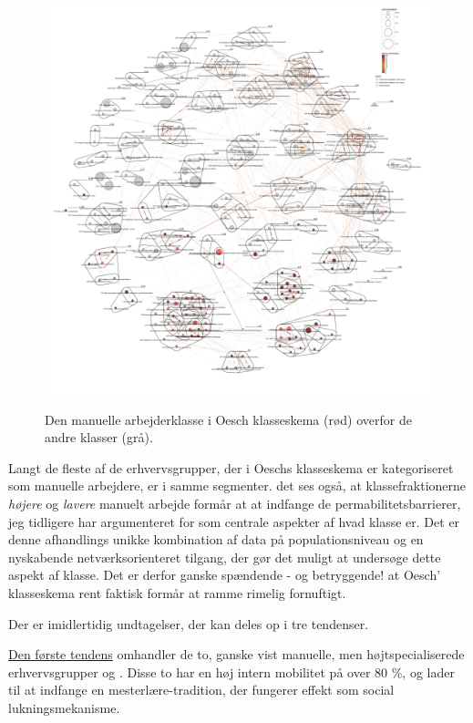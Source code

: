 %
   \begin{figure}[H]
   \begin{centering}
    \caption[Netværkskort: Manuel arbejderklasse - andre klasse]{Den manuelle arbejderklasse i Oesch klasseskema (rød) overfor de andre klasser (grå).}
    \includegraphics[width=\textwidth]{fig/netvaerkskort/kort_fokus_manuel_nonmanuel_roedgraa.pdf}
    \label{fig delanalyse3 klasse manuelt ikkemanuel}
   \end{centering}
   \end{figure}   
%


Langt de fleste af de erhvervsgrupper, der i Oeschs klasseskema er kategoriseret som manuelle arbejdere, er i samme segmenter. det ses også, at klassefraktionerne \emph{højere} og \emph{lavere} manuelt arbejde formår at at indfange de permabilitetsbarrierer, jeg tidligere har argumenteret for som centrale aspekter af hvad klasse er. Det er denne afhandlings unikke kombination af data på populationsniveau og en nyskabende netværksorienteret tilgang, der gør det muligt at undersøge dette aspekt af klasse. Det er derfor ganske spændende - og betryggende! at Oesch' klasseskema rent faktisk formår at ramme rimelig fornuftigt.

Der er imidlertidig undtagelser, der kan deles op i tre tendenser.

\underline{Den første tendens} omhandler de to, ganske vist manuelle, men højtspecialiserede erhvervsgrupper  og . Disse to har en høj intern mobilitet på over 80 \%, og lader til at indfange en mesterlære-tradition, der fungerer effekt som social lukningsmekanisme. 

